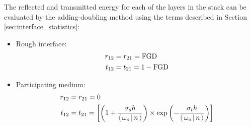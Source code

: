 %

The reflected and transmitted energy for each of the layers in the stack can be evaluated by the adding-doubling method using the terms described in Section \ref{sec:interface_statistics}:
\begin{itemize}
    \item{
        Rough interface:
        \begin{equation}
            \begin{aligned}
                r_{12} &= r_{21} = \operatorname{FGD}\\
                t_{12} &= t_{21} = 1-\operatorname{FGD}
            \end{aligned}
        \end{equation}
    } 
    \item{
        Participating medium:
        \begin{equation}
            \begin{aligned}
                r_{12} &= r_{21} = 0\\
                t_{12} &= t_{21} = \left[ \left(1 +  \frac{\sigma_s h}{\dotproduct{\omega_o}{n}}\right) \times \exp{\left(-\frac{\sigma_t h}{\dotproduct{\omega_o}{n}}\right)} \right]
            \end{aligned}
        \end{equation}
    }
\end{itemize}

